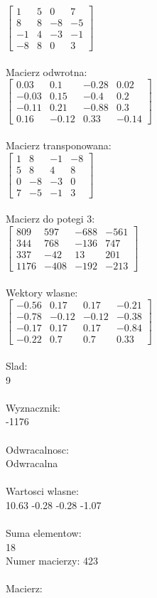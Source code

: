 \documentclass[a4paper,12pt]{article}
\begin{document}
$\begin{bmatrix} 1&5&0&7\\8&8&-8&-5\\-1&4&-3&-1\\-8&8&0&3 \end{bmatrix}$
\\
\\
Macierz odwrotna:\\

$\begin{bmatrix} 0.03&0.1&-0.28&0.02\\-0.03&0.15&-0.4&0.2\\-0.11&0.21&-0.88&0.3\\0.16&-0.12&0.33&-0.14 \end{bmatrix}$
\\
\\
Macierz transponowana:\\

$\begin{bmatrix} 1&8&-1&-8\\5&8&4&8\\0&-8&-3&0\\7&-5&-1&3 \end{bmatrix}$
\\
\\
Macierz do potegi 3:\\

$\begin{bmatrix} 809&597&-688&-561\\344&768&-136&747\\337&-42&13&201\\1176&-408&-192&-213 \end{bmatrix}$
\\
\\
Wektory wlasne:\\

$\begin{bmatrix} -0.56&0.17&0.17&-0.21\\-0.78&-0.12&-0.12&-0.38\\-0.17&0.17&0.17&-0.84\\-0.22&0.7&0.7&0.33 \end{bmatrix}$
\\
\\
Slad:\\
9
\\
\\
Wyznacznik:\\
-1176
\\
\\
Odwracalnosc:\\
Odwracalna
\\
\\
Wartosci wlasne:\\
10.63 -0.28 -0.28 -1.07
\\
\\
Suma elementow:\\
18
\\
\newpage
Numer macierzy:
423
\\
\\
Macierz:\\
\end{document}
